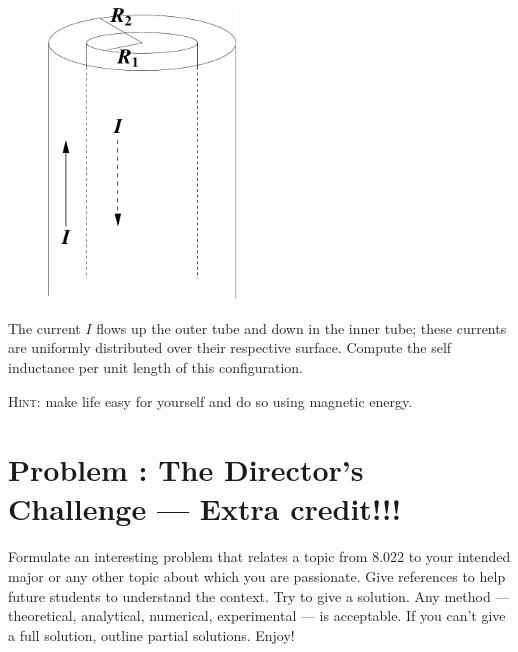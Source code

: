 \documentclass[problems]{esg8022pset}
\begin{document}
  \begin{figure}[H]
    \centering
    \includegraphics[width = 5cm]{coaxind}
    \label{fig:coax}
  \end{figure}

  The current $I$ flows up the outer tube and down in the
  inner tube; these currents are uniformly distributed over their
  respective surface.  Compute the self inductance per unit length of
  this configuration.

  \noindent \textsc{Hint}: make life easy for yourself and do so using
  magnetic energy.
\section{Problem \thesection: The Director's Challenge --- Extra credit!!!}
  Formulate an interesting problem that relates a topic from 8.022 to your
  intended major or any other topic about which you are passionate.  Give references
  to help future students to understand the context.  Try to give a solution.
  Any method --- theoretical, analytical, numerical, experimental --- is acceptable.
  If you can't give a full solution, outline partial solutions. Enjoy!
\end{document}
